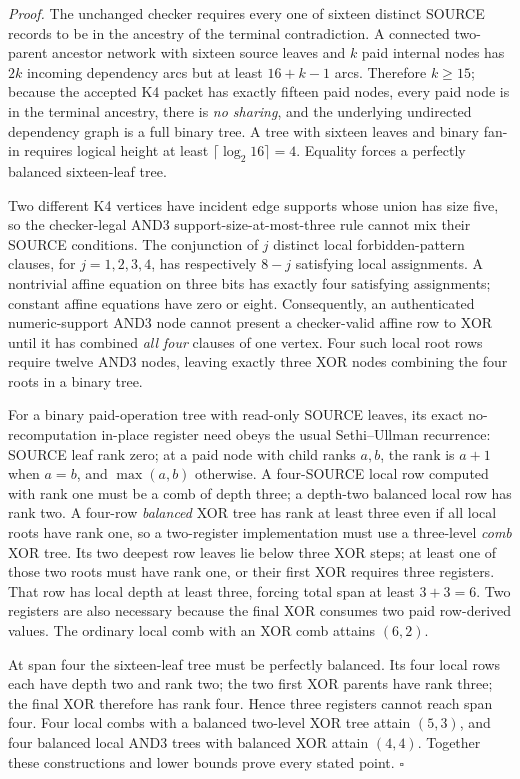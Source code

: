 \documentclass[11pt]{article}
\begin{document}
\noindent\emph{Proof.} The unchanged checker requires every one of sixteen distinct SOURCE records to be in the ancestry of the terminal contradiction. A connected two-parent ancestor network with sixteen source leaves and $k$ paid internal nodes has $2k$ incoming dependency arcs but at least $16+k-1$ arcs. Therefore $k\ge15$; because the accepted K4 packet has exactly fifteen paid nodes, every paid node is in the terminal ancestry, there is \emph{no sharing}, and the underlying undirected dependency graph is a full binary tree. A tree with sixteen leaves and binary fan-in requires logical height at least $\lceil\log_2 16\rceil=4$. Equality forces a perfectly balanced sixteen-leaf tree.

Two different K4 vertices have incident edge supports whose union has size five, so the checker-legal AND3 support-size-at-most-three rule cannot mix their SOURCE conditions. The conjunction of $j$ distinct local forbidden-pattern clauses, for $j=1,2,3,4$, has respectively $8-j$ satisfying local assignments. A nontrivial affine equation on three bits has exactly four satisfying assignments; constant affine equations have zero or eight. Consequently, an authenticated numeric-support AND3 node cannot present a checker-valid affine row to XOR until it has combined \emph{all four} clauses of one vertex. Four such local root rows require twelve AND3 nodes, leaving exactly three XOR nodes combining the four roots in a binary tree.

For a binary paid-operation tree with read-only SOURCE leaves, its exact no-recomputation in-place register need obeys the usual Sethi--Ullman recurrence: SOURCE leaf rank zero; at a paid node with child ranks $a,b$, the rank is $a+1$ when $a=b$, and $\max(a,b)$ otherwise. A four-SOURCE local row computed with rank one must be a comb of depth three; a depth-two balanced local row has rank two. A four-row \emph{balanced} XOR tree has rank at least three even if all local roots have rank one, so a two-register implementation must use a three-level \emph{comb} XOR tree. Its two deepest row leaves lie below three XOR steps; at least one of those two roots must have rank one, or their first XOR requires three registers. That row has local depth at least three, forcing total span at least $3+3=6$. Two registers are also necessary because the final XOR consumes two paid row-derived values. The ordinary local comb with an XOR comb attains $(6,2)$.

At span four the sixteen-leaf tree must be perfectly balanced. Its four local rows each have depth two and rank two; the two first XOR parents have rank three; the final XOR therefore has rank four. Hence three registers cannot reach span four. Four local combs with a balanced two-level XOR tree attain $(5,3)$, and four balanced local AND3 trees with balanced XOR attain $(4,4)$. Together these constructions and lower bounds prove every stated point. \(\square\)
\end{document}
